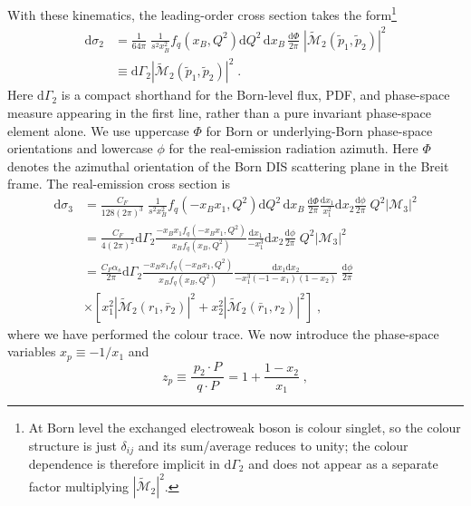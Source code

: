 \documentclass[a4paper,11pt]{article}
\newcommand{\ldot}[2]  {\:{#1}\!\cdot\!{#2}\:}
\begin{document}
With these kinematics, the leading-order cross section takes the form\footnote{At Born level the exchanged electroweak boson is colour singlet, so the colour structure is just $\delta_{ij}$ and its sum/average reduces to unity; the colour dependence is therefore implicit in $\mathrm{d}\Gamma_2$ and does not appear as a separate factor multiplying $|\widetilde{\mathcal{M}}_2|^2$.}
\begin{align}
  \mathrm{d} \sigma_2 &= \frac{1}{64\pi}\;\frac{1}{s^2 x_B^2}f_q(x_B,Q^2)
    \mathrm{d} Q^2\, \mathrm{d} x_B\, \frac{\mathrm{d}\Phi}{2\pi}\; |\widetilde{\mathcal{M}}_2(\tilde{p}_1,\tilde{p}_2)|^2 \\
  &\equiv \mathrm{d} \Gamma_2 |\widetilde{\mathcal{M}}_2(\tilde{p}_1,\tilde{p}_2)|^2\;.
\end{align}
Here $\mathrm{d}\Gamma_2$ is a compact shorthand for the Born-level flux, PDF, and phase-space measure appearing in the first line, rather than a pure invariant phase-space element alone. We use uppercase $\Phi$ for Born or underlying-Born phase-space orientations and lowercase $\phi$ for the real-emission radiation azimuth. Here $\Phi$ denotes the azimuthal orientation of the Born DIS scattering plane in the Breit frame.
The real-emission cross section is
\begin{align}
  \mathrm{d}\sigma_3 &= \frac{C_F}{128(2\pi)^3}\;\frac{1}{s^2x_B^2}
    f_q(-x_B x_1,Q^2)
    \mathrm{d} Q^2\, \mathrm{d} x_B\,\frac{\mathrm{d}\Phi}{2\pi}\frac{\mathrm{d} x_1}{x_1^2}\mathrm{d}x_2\frac{\mathrm{d} \phi}{2\pi}\;
    Q^2 |\mathcal{M}_3|^2 \\
  &= \frac{C_F}{4(2\pi)^2}\mathrm{d}\Gamma_2
    \frac{-x_B x_1f_q(-x_B x_1,Q^2)}
         { x_B    f_q( x_B    ,Q^2)}
    \frac{\mathrm{d} x_1}{-x_1^3}\mathrm{d}x_2
    \frac{\mathrm{d}\phi}{2\pi}\;
    Q^2 |\mathcal{M}_3|^2 \\
  &= \frac{C_F\alpha_s}{2\pi}\mathrm{d}\Gamma_2
    \frac{-x_B x_1f_q(-x_B x_1,Q^2)}
         { x_B    f_q( x_B    ,Q^2)}
    \frac{\mathrm{d} x_1 \mathrm{d}x_2}{-x_1^3(-1-x_1)(1-x_2)}\;\frac{\mathrm{d}\phi}{2\pi}
\nonumber\\&
   \times \left[ x_1^2|\widetilde{\mathcal{M}}_2(r_1,\bar{r}_2)|^2 +
           x_2^2|\widetilde{\mathcal{M}}_2(\bar{r}_1,r_2)|^2 \right]\;,
\label{eq:QCDC1}
\end{align}
where we have performed the colour trace. We now introduce the phase-space variables $x_p \equiv -1/x_1$ and
\begin{equation}
z_p \equiv \frac{\ldot{p_2}{P}}{\ldot{q}{P}} = 1 + \frac{1-x_2}{x_1}\;,
\end{equation}
\end{document}
